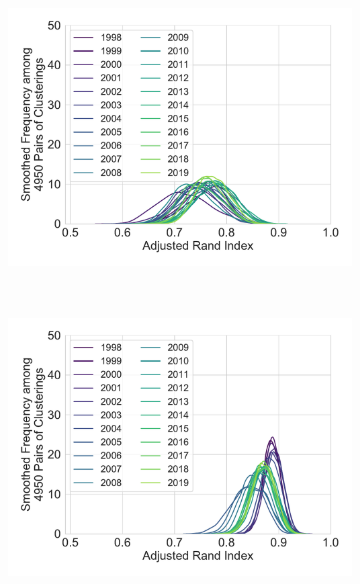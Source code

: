 \documentclass[varwidth, border=0pt]{standalone}
\begin{document}
\begin{figure}
\begin{subfigure}{0.5\linewidth}
			\includegraphics[width=\linewidth]{../../graphics/variance_infomap_runs_us_reg_rand}
		\end{subfigure}~%
		\begin{subfigure}{0.5\linewidth}
			\includegraphics[width=\linewidth]{../../graphics/variance_infomap_runs_de_reg_rand}
		\end{subfigure}
	\end{figure}
	
\end{document}
